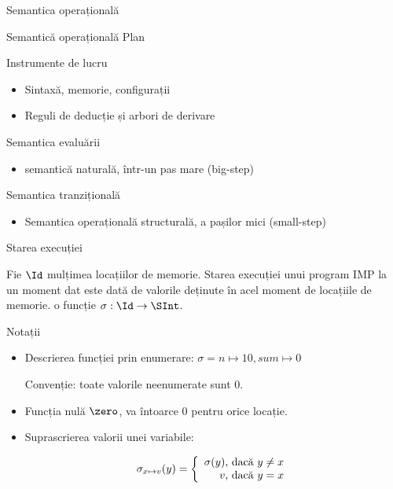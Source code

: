\documentclass[xcolor=pdftex,romanian,colorlinks]{beamer}
\begin{document}
\begin{section}{Semantica operațională}
\begin{frame}{Semantică operațională}
{Plan}
\begin{itemize}
 \vitem Instrumente de lucru
 \begin{itemize}
  \item Sintaxă, memorie, configurații
  \item Reguli de deducție și arbori de derivare
 \end{itemize}
 \vitem Semantica evaluării
   \begin{itemize}
     \item semantică naturală, într-un pas mare (big-step)
	\end{itemize}
 \vitem Semantica tranzițională
	\begin{itemize}
		\item Semantica operațională structurală, a pașilor mici (small-step)
	\end{itemize}
 \end{itemize}
\end{frame}

\begin{frame}{Starea execuției}
\begin{block}{}
Fie $\Id$ mulțimea locațiilor de memorie.
Starea execuției unui program IMP la un moment dat este dată de valorile deținute în acel moment de locațiile de memorie.
 o funcție $\sigma : \Id \rightarrow \SInt$.
\end{block}
\begin{block}{Notații}
\begin{itemize}
\item Descrierea funcției prin enumerare:
$\sigma = n \mapsto 10, sum \mapsto 0$

Convenție: toate valorile neenumerate sunt 0.
\item Funcția nulă $\zero$, va întoarce $0$ pentru orice locație.
\item Suprascrierea valorii unei variabile:

$$\sigma_{x \mapsto v} (y) = \left\{\begin{array}{r@{\mbox{, dacă }}l}
\sigma	(y) & y \neq x \\
v & y = x
\end{array}
\right.$$
\end{itemize}
\end{block}
\end{frame}


\end{section}
\end{document}
